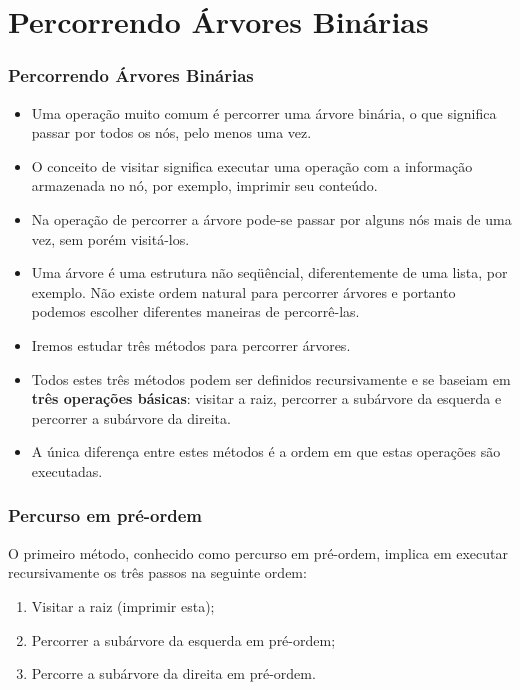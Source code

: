 \section{Percorrendo Árvores Binárias}
\begin{frame}
  \frametitle{Percorrendo Árvores Binárias}


\begin{itemize}
  \item Uma operação muito comum é percorrer uma árvore binária, o que significa passar por todos os nós, pelo menos uma vez.

 \item  O conceito de visitar significa executar uma operação com a informação armazenada no nó, por exemplo, imprimir seu conteúdo. 

 \item Na operação de percorrer a árvore pode-se passar por alguns nós mais de uma vez, sem porém visitá-los.

 \item Uma árvore é uma estrutura não seqüêncial, diferentemente de uma lista, por exemplo. Não existe ordem natural para percorrer árvores e portanto podemos escolher diferentes maneiras de percorrê-las. 

 \item  Iremos estudar três métodos para percorrer árvores. 

 \item Todos estes três métodos podem ser definidos recursivamente e se baseiam em \textbf{três operações básicas}: visitar a raiz, percorrer a subárvore da esquerda e percorrer a subárvore da direita. 

 \item A única diferença entre estes métodos é a ordem em que estas operações são executadas.
\end{itemize}

\end{frame}

\begin{frame}
  
  \frametitle{Percurso em pré-ordem}
  
O primeiro método, conhecido como percurso em pré-ordem, implica em executar recursivamente os três passos na seguinte ordem: 
 
\begin{enumerate}
  \item Visitar a raiz (imprimir esta);
 \item Percorrer a subárvore da esquerda em pré-ordem;
 \item Percorre a subárvore da direita em pré-ordem.

\end{enumerate}

\end{frame}


